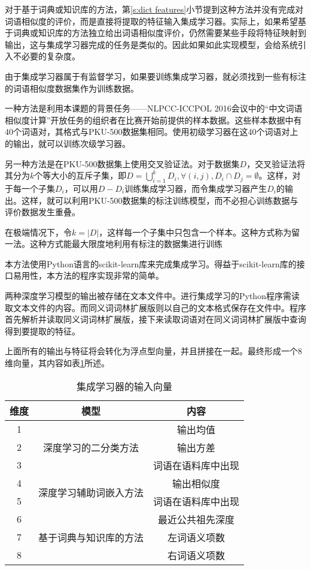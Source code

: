 对于基于词典或知识库的方法，第\ref{s:dict features}小节提到这种方法并没有完成对词语相似度的评价，而是直接将提取的特征输入集成学习器。实际上，如果希望基于词典或知识库的方法独立给出词语相似度评价，仍然需要某些手段将特征映射到输出，这与集成学习器完成的任务是类似的。因此如果如此实现模型，会给系统引入不必要的复杂度。

由于集成学习器属于有监督学习，如果要训练集成学习器，就必须找到一些有标注的词语相似度数据集作为训练数据。

一种方法是利用本课题的背景任务——NLPCC-ICCPOL 2016会议中的“中文词语相似度计算”开放任务的组织者在比赛开始前提供的样本数据。这些样本数据中有40个词语对，其格式与PKU-500数据集相同。使用初级学习器在这40个词语对上的输出，就可以训练次级学习器。

另一种方法是在PKU-500数据集上使用交叉验证法。对于数据集$D$，交叉验证法将其分为$k$个等大小的互斥子集，即$D = \bigcup_{i = 1}^k D_i, \forall (i, j), D_i \cap D_j = \emptyset$。这样，对于每一个子集$D_i$，可以用$D - D_i$训练集成学习器，而令集成学习器产生$D_i$的输出。这样，就可以利用PKU-500数据集的标注训练模型，而不必担心训练数据与评价数据发生重叠。

在极端情况下，令$k = |D|$，这样每一个子集中只包含一个样本。这种方式称为留一法。这种方式能最大限度地利用有标注的数据集进行训练

本方法使用Python语言的scikit-learn库来完成集成学习。得益于scikit-learn库的接口易用性，本方法的程序实现非常的简单。

两种深度学习模型的输出被存储在文本文件中。进行集成学习的Python程序需读取文本文件的内容。而同义词词林扩展版则以自己的文本格式保存在文件中。程序首先解析并读取同义词词林扩展版，接下来读取词语对在同义词词林扩展版中查询得到要提取的特征。

上面所有的输出与特征将会转化为浮点型向量，并且拼接在一起。最终形成一个8维向量，其内容如表\ref{t:features}所述。

\begin{table}[h]
	\caption{集成学习器的输入向量}
	\label{t:features}
	\vspace{0.5em}\centering\wuhao
	\begin{tabular}{ccc}
		\toprule[1.5pt]
		维度 & 模型 & 内容 \\
		\midrule[1pt]
		1 & \multirow{3}{*}{深度学习的二分类方法} & 输出均值 \\
		2 &  & 输出方差 \\
		3 &  & 词语在语料库中出现 \\
		\hline
		4 & \multirow{2}{*}{深度学习辅助词嵌入方法} & 输出相似度 \\
		5 &  & 词语在语料库中出现 \\
		\hline
		6 & \multirow{3}{*}{基于词典与知识库的方法} & 最近公共祖先深度 \\
		7 &  & 左词语义项数 \\
		8 &  & 右词语义项数 \\
		\bottomrule[1.5pt]
	\end{tabular}
\end{table}

